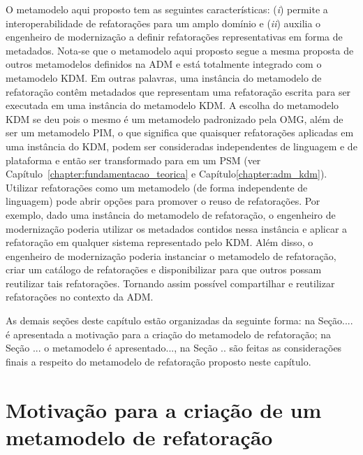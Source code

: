 O metamodelo aqui proposto tem as seguintes características: (\textit{i}) permite a interoperabilidade de refatorações para um amplo domínio e (\textit{ii}) auxilia o engenheiro de modernização a definir refatorações representativas em forma de metadados. Nota-se que o metamodelo aqui proposto segue a mesma proposta de outros metamodelos definidos na ADM e está totalmente integrado com o metamodelo KDM. Em outras palavras, uma instância do metamodelo de refatoração contêm metadados que representam uma refatoração escrita para ser executada em uma instância do metamodelo KDM. A escolha do metamodelo KDM se deu pois o mesmo é um metamodelo padronizado pela OMG, além de ser um metamodelo PIM, o que significa que quaisquer refatorações aplicadas em uma instância do KDM, podem ser consideradas independentes de linguagem e de plataforma e então ser transformado para em um PSM (ver Capítulo~\ref{chapter:fundamentacao_teorica} e Capítulo\ref{chapter:adm_kdm}). Utilizar refatorações como um metamodelo (de forma independente de linguagem) pode abrir opções para promover o reuso de refatorações. Por exemplo, dado uma instância do metamodelo de refatoração, o engenheiro de modernização poderia utilizar os metadados contidos nessa instância e aplicar a refatoração em qualquer sistema representado pelo KDM. Além disso, o engenheiro de modernização poderia instanciar o metamodelo de refatoração, criar um catálogo de refatorações e disponibilizar para que outros possam reutilizar tais refatorações. Tornando assim possível compartilhar e reutilizar refatorações no contexto da ADM.


As demais seções deste capítulo estão organizadas da seguinte forma: na Seção.... é apresentada a motivação para a criação do metamodelo de refatoração; na Seção ... o metamodelo é apresentado..., na Seção .. são feitas as considerações finais a respeito do metamodelo de refatoração proposto neste capítulo.

\section{Motivação para a criação de um metamodelo de refatoração} %
\label{sec:motiva_o_para_a_cria_o_de_um_meta_modelo_de_refatora_o}


